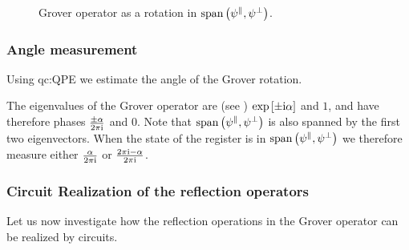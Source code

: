 \begin{figure}[t]
    \begin{center}
        
    \end{center}
    \caption{Grover operator as a rotation in $\mathrm{span}\left(\psi^{\parallel},\psi^{\perp}\right)$.}
    \label{fig:rotationSketch}
\end{figure}

\subsubsection{Angle measurement}\label{sec:groverAngleMeasurement}

Using \gls{qc:QPE} we estimate the angle of the Grover rotation.

The eigenvalues of the Grover operator are (see ) $\mathrm{exp}\left[\pm \mathrm{i}\alpha\right]$ and $1$, and have therefore phases $\frac{\pm\alpha}{2\pi\mathrm{i}}$ and $0$.
Note that $\mathrm{span}\left(\psi^{\parallel},\psi^{\perp}\right)$ is also spanned by the first two eigenvectors.
When the state of the register is in $\mathrm{span}\left(\psi^{\parallel},\psi^{\perp}\right)$ we therefore measure either $\frac{\alpha}{2\pi\mathrm{i}}$ or $\frac{2\pi\mathrm{i}-\alpha}{2\pi\mathrm{i}}$.


\subsubsection{Circuit Realization of the reflection operators}

Let us now investigate how the reflection operations in the Grover operator can be realized by circuits.

